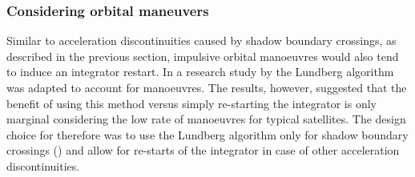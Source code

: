 \subsubsection{Considering orbital maneuvers}
\label{sec:propagation-state-maneuvers}

Similar to acceleration discontinuities caused by shadow boundary crossings, as described in the previous section, impulsive orbital manoeuvres would also tend to induce an
integrator restart. In a research study by \citet{weidemeyer2013} the Lundberg algorithm was adapted to account for manoeuvres. The results, however, suggested that the
benefit of using this method versus simply re-starting the integrator is only marginal considering the low rate of manoeuvres for typical satellites. The design choice for
\neptune therefore was to use the Lundberg algorithm only for shadow boundary crossings () and allow for re-starts of the integrator
in case of other acceleration discontinuities.


